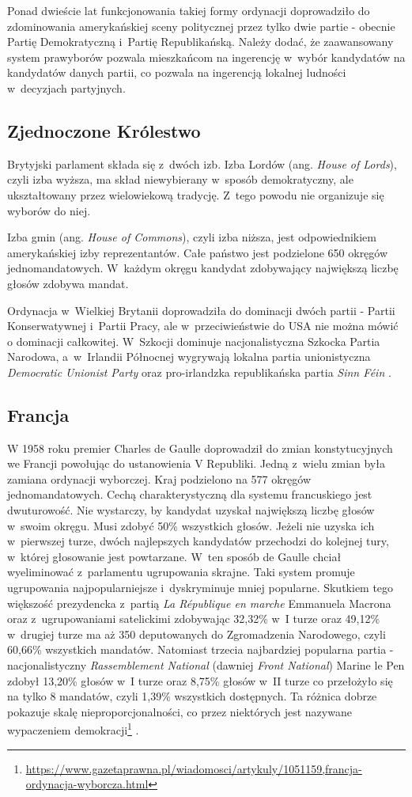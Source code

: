 Ponad dwieście lat funkcjonowania takiej formy ordynacji doprowadziło do zdominowania amerykańskiej sceny politycznej przez tylko dwie partie - obecnie Partię Demokratyczną i~Partię Republikańską. Należy dodać, że zaawansowany system prawyborów pozwala mieszkańcom na ingerencję w~wybór kandydatów na kandydatów danych partii, co pozwala na ingerencją lokalnej ludności w~decyzjach partyjnych.

\subsection{Zjednoczone Królestwo}
Brytyjski parlament składa się z~dwóch izb. Izba Lordów (ang. \textit{House of Lords}), czyli izba wyższa, ma skład niewybierany w~sposób demokratyczny, ale ukształtowany przez wielowiekową tradycję. Z~tego powodu nie organizuje się wyborów do niej.

Izba gmin (ang. \textit{House of Commons}), czyli izba niższa, jest odpowiednikiem amerykańskiej izby reprezentantów. Całe państwo jest podzielone 650 okręgów jednomandatowych. W~każdym okręgu kandydat zdobywający największą liczbę głosów zdobywa mandat.

Ordynacja w~Wielkiej Brytanii doprowadziła do dominacji dwóch partii - Partii Konserwatywnej i~Partii Pracy, ale w~przeciwieństwie do USA nie można mówić o dominacji całkowitej. W~Szkocji dominuje nacjonalistyczna Szkocka Partia Narodowa, a~w~Irlandii Północnej wygrywają lokalna partia unionistyczna \textit{Democratic Unionist Party} oraz pro-irlandzka republikańska partia \textit{Sinn Féin} \cite{Kwiatkowski}.

\subsection{Francja}
W 1958 roku premier Charles de Gaulle doprowadził do zmian konstytucyjnych we Francji powołując do ustanowienia V Republiki. Jedną z~wielu zmian była zamiana ordynacji wyborczej. Kraj podzielono na 577 okręgów jednomandatowych. Cechą charakterystyczną dla systemu francuskiego jest dwuturowość. Nie wystarczy, by kandydat uzyskał największą liczbę głosów w~swoim okręgu. Musi zdobyć 50\% wszystkich głosów. Jeżeli nie uzyska ich w~pierwszej turze, dwóch najlepszych kandydatów przechodzi do kolejnej tury, w~której głosowanie jest powtarzane. W~ten sposób de Gaulle chciał wyeliminować z~parlamentu ugrupowania skrajne. Taki system promuje ugrupowania najpopularniejsze i~dyskryminuje mniej popularne. Skutkiem tego większość prezydencka z~partią \textit{La République en marche} Emmanuela Macrona oraz z~ugrupowaniami satelickimi zdobywając 32,32\% w~I turze oraz 49,12\% w~drugiej turze ma aż 350 deputowanych do Zgromadzenia Narodowego, czyli 60,66\% wszystkich mandatów. Natomiast trzecia najbardziej popularna partia - nacjonalistyczny \textit{Rassemblement National} (dawniej \textit{Front National}) Marine le Pen zdobył 13,20\% głosów w~I turze oraz 8,75\% głosów w~II turze co przełożyło się na tylko 8 mandatów, czyli 1,39\% wszystkich dostępnych. Ta różnica dobrze pokazuje skalę nieproporcjonalności, co przez niektórych jest nazywane wypaczeniem demokracji\footnote{\url{https://www.gazetaprawna.pl/wiadomosci/artykuly/1051159,francja-ordynacja-wyborcza.html}} \cite{Myśliwiec}.

